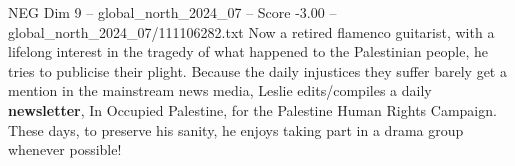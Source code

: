 \begin{textsample}{NEG Dim 9 – global\_north\_2024\_07 – Score -3.00 – global\_north\_2024\_07/111106282.txt}
Now a retired flamenco guitarist, with a lifelong interest in the tragedy of what happened to the Palestinian people, he tries to publicise their plight.
Because the daily injustices they suffer barely get a mention in the mainstream news media, Leslie edits/compiles a daily \textbf{newsletter}, In Occupied Palestine, for the Palestine Human Rights Campaign.
These days, to preserve his sanity, he enjoys taking part in a drama group whenever possible!

\end{textsample}
